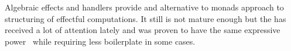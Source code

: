 Algebraic effects and handlers provide and alternative to monads approach to structuring
of effectful computations. It still is not mature enough but the has received a lot of
attention lately and was proven to have the same
expressive power~\cite{DBLP:journals/corr/ForsterKLP16} while requiring less
boilerplate in some cases.

